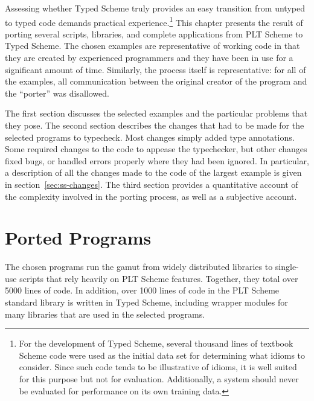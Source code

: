 \newcommand\onestar{\multicolumn{1}{c|}{$\star$}}
\newcommand\onestarlast{\multicolumn{1}{c||}{$\star$}}
\newcommand\twostar{\multicolumn{1}{c|}{$\star\star$}}
\newcommand\threestar{\multicolumn{1}{c|}{$\star\star\star$}}


\begin{schemeregion}

Assessing whether Typed Scheme truly provides an easy transition from
untyped to typed code
 demands practical experience.\footnote{For the development of Typed
   Scheme, several thousand lines of textbook Scheme code were used
   as the initial data set for determining what idioms to consider.
   Since such code tends to be illustrative of idioms, it is well
   suited for this purpose but not for evaluation. Additionally, a
   system should never be evaluated for performance on its own
   training data.  } This chapter presents the result
 of porting several scripts, libraries, and complete applications
 from PLT Scheme to Typed Scheme. The chosen examples are
 representative of working code in that they are created by experienced
 programmers and they have been in use for a significant amount of
 time. Similarly, the process itself is representative: for all of the
 examples,
 all communication between the original creator of the program and the
 ``porter'' was 
 disallowed.


 The first section discusses the selected examples and the
  particular problems that they pose.  The second section
  describes the changes that had to be made for the selected programs
  to typecheck.  Most changes simply added type annotations. Some required changes to the code to
  appease the typechecker, but other
 changes fixed bugs, or handled errors
  properly where they had been ignored.  In particular, a description of all the
  changes made to the code of the largest example is given in section~\ref{sec:ss-changes}.
  The third section
  provides a quantitative account of the complexity involved in the
  porting process, as well as a subjective account.

\section{Ported Programs} %
\label{s:prog}
The chosen programs run the gamut from widely distributed
libraries to single-use scripts that rely heavily on PLT Scheme
features.  
%
Together, they total over 5000 lines of code.  In addition,
over 1000 lines of code in the PLT Scheme standard library is written
in Typed Scheme, including wrapper modules for many libraries that
are used in the selected programs.


\end{schemeregion}
